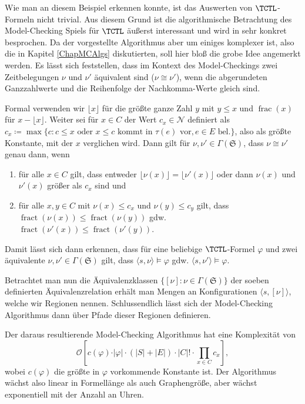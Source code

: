 Wie man an diesem Beispiel erkennen konnte, ist das Auswerten von $\TCTL$-Formeln nicht trivial.
Aus diesem Grund ist die algorithmische Betrachtung des Model-Checking Spiels für $\TCTL$ äußerst interessant und wird in \cite{alur1990model} sehr konkret besprochen.
Da der vorgestellte Algorithmus aber um einiges komplexer ist, also die in Kapitel \ref{ChapMCAlgs} diskutierten, soll hier bloß die grobe Idee angemerkt werden.
Es lässt sich feststellen, dass im Kontext des Model-Checkings zwei Zeitbelegungen $\nu$ und $\nu'$ äquivalent sind ($\nu \cong \nu'$), wenn die abgerundeten Ganzzahlwerte und die Reihenfolge der Nachkomma-Werte gleich sind.

Formal verwenden wir $\lfloor x \rfloor$ für die größte ganze Zahl $y$ mit $y\leq x$ und $\operatorname{frac}(x)$ für $x-\lfloor x \rfloor$. Weiter sei für $x\in C$ der Wert $c_x\in \mathcal{N}$ definiert als $c_x\coloneqq \max\{c : c \leq x \text{ oder } x\leq c \text{ kommt in } \tau(e) \text{ vor}, e\in E \text{ bel.}\}$, also als größte Konstante, mit der $x$ verglichen wird.
Dann gilt für $\nu,\nu'\in \Gamma(\mathfrak{S})$, dass $\nu \cong \nu'$ genau dann, wenn
\begin{enumerate}
	\item für alle $x\in C$ gilt, dass entweder $\lfloor \nu(x)\rfloor = \lfloor \nu'(x)\rfloor$ oder dann $\nu(x)$ und $\nu'(x)$ größer als $c_x$ sind und
	\item für alle $x,y\in C$ mit $\nu(x)\leq c_x$ und $\nu(y)\leq c_y$ gilt, dass $\operatorname{fract}(\nu(x))\leq \operatorname{fract}(\nu(y))$ gdw. $\operatorname{fract}(\nu'(x))\leq \operatorname{fract}(\nu'(y))$. \cite{alur1990model}
\end{enumerate}

Damit lässt sich dann erkennen, dass für eine beliebige $\TCTL$-Formel $\varphi$ und zwei äquivalente $\nu,\nu'\in \Gamma(\mathfrak{S})$ gilt, dass $\langle s,\nu \rangle\models \varphi$ gdw. $\langle s,\nu'\rangle \models \varphi$. \cite{alur1990model}

Betrachtet man nun die Äquivalenzklassen $\{[\nu] : \nu\in \Gamma(\mathfrak{S})\}$ der soeben definierten Äquivalenzrelation erhält man Mengen an Konfigurationen $\langle s,[\nu]\rangle$, welche wir Regionen nennen.
Schlussendlich lässt sich der Model-Checking Algorithmus dann über Pfade dieser Regionen definieren. \cite{alur1990model}

Der daraus resultierende Model-Checking Algorithmus hat eine Komplexität von 
$$\mathcal{O}\left[c(\varphi)\cdot \vert\varphi\vert \cdot (|S|+|E|) \cdot |C|! \cdot \prod_{x\in C}c_x\right],$$ 
wobei $c(\varphi)$ die größte in $\varphi$ vorkommende Konstante ist.
Der Algorithmus wächst also linear in Formellänge als auch Graphengröße, aber wächst exponentiell mit der Anzahl an Uhren. \cite{alur1990model}

